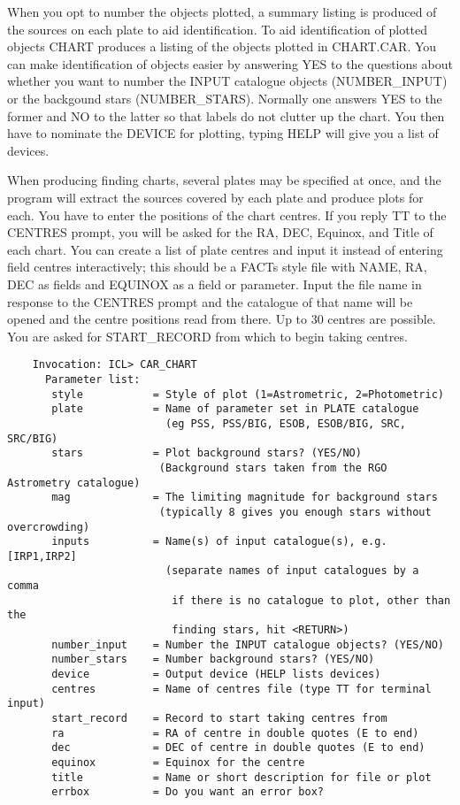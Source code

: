 When you opt to number the objects plotted, a summary listing is produced
of the sources on each plate to aid identification.
To aid identification of plotted objects CHART produces
a listing of the objects plotted in CHART.CAR.
You can make identification of objects easier by answering YES to the
questions about whether you want to number the INPUT catalogue
objects (NUMBER\_INPUT) or the backgound stars (NUMBER\_STARS).
Normally one answers YES to the former and NO to the latter
so that labels do not clutter up the chart.
You then have to nominate the DEVICE for plotting, typing HELP
will give you a list of devices.

When producing finding charts, several plates may be specified at once, and the
program will extract the sources covered by each plate and produce plots for
each.
You have to enter the positions of the chart centres.
If you reply TT to the CENTRES prompt, you will be asked for the
RA, DEC, Equinox, and Title of each chart.
You can create a list of plate centres and input it instead of entering field
centres interactively; this should be a FACTs style file with NAME, RA, DEC as
fields and EQUINOX as a field or parameter.
Input the file name in response to the CENTRES prompt and
the catalogue of that name will be opened and the centre positions
read from there.
Up to 30 centres are possible.
You are asked for START\_RECORD from which to begin taking centres.

\begin{verbatim}
    Invocation: ICL> CAR_CHART
      Parameter list:
       style           = Style of plot (1=Astrometric, 2=Photometric)
       plate           = Name of parameter set in PLATE catalogue
                         (eg PSS, PSS/BIG, ESOB, ESOB/BIG, SRC, SRC/BIG)
       stars           = Plot background stars? (YES/NO)
                        (Background stars taken from the RGO Astrometry catalogue)
       mag             = The limiting magnitude for background stars
                        (typically 8 gives you enough stars without overcrowding)
       inputs          = Name(s) of input catalogue(s), e.g. [IRP1,IRP2]
                         (separate names of input catalogues by a comma
                          if there is no catalogue to plot, other than the
                          finding stars, hit <RETURN>)
       number_input    = Number the INPUT catalogue objects? (YES/NO)
       number_stars    = Number background stars? (YES/NO)
       device          = Output device (HELP lists devices)
       centres         = Name of centres file (type TT for terminal input)
       start_record    = Record to start taking centres from
       ra              = RA of centre in double quotes (E to end)
       dec             = DEC of centre in double quotes (E to end)
       equinox         = Equinox for the centre
       title           = Name or short description for file or plot
       errbox          = Do you want an error box?
\end{verbatim}

